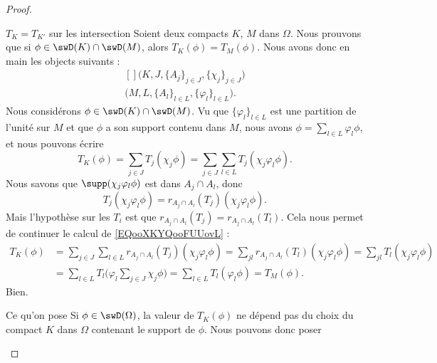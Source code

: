 \begin{proof}
\begin{subproof}
    \item[$T_K=T_{K'}  $ sur les intersection]
        Soient deux compacts \( K\), \( M\) dans \( \Omega\). Nous prouvons que si \( \phi\in\swD(K)\cap\swD(M)\), alors \( T_{K}(\phi)=T_{M}(\phi)\). Nous avons donc en main les objects suivants :
        \begin{equation}
            \begin{aligned}[]
                \big( K, J, \{ A_j \}_{j\in J}, \{ \chi_j \}_{j\in J} \big)\\
                \big( M, L, \{ A_l \}_{l\in L}, \{ \varphi_l \}_{l\in L} \big).
            \end{aligned}
        \end{equation}
        Nous considérons \( \phi\in\swD(K)\cap\swD(M)\). Vu que \(\{ \varphi_l \}_{l\in L} \) est une partition de l'unité sur \( M\) et que \( \phi\) a son support contenu dans \( M\), nous avons \( \phi=\sum_{l\in L}\varphi_l\phi\), et nous pouvons écrire
        \begin{equation}        \label{EQooXKYQooFUUovL}
            T_K(\phi)=\sum_{j\in J}T_j(\chi_j\phi)=\sum_{j\in J}\sum_{l\in L}T_j(\chi_j\varphi_l\phi).
        \end{equation}
        Nous savons que \( \supp(\chi_j\varphi_l\phi)\) est dans \( A_j\cap A_l\), donc 
        \begin{equation}
            T_j(\chi_j\varphi_l\phi)=r_{A_j\cap A_l}(T_j)(\chi_j\varphi_l\phi).
        \end{equation}
        Mais l'hypothèse sur les \( T_i\) est que \( r_{A_j\cap A_l}(T_j)=r_{A_j\cap A_l}(T_l)\). Cela nous permet de continuer le calcul de \eqref{EQooXKYQooFUUovL} :
        \begin{subequations}
            \begin{align}
                T_K(\phi)&=\sum_{j\in J}\sum_{l\in L}r_{A_j\cap A_l}(T_j)(\chi_j\varphi_l\phi)
                =\sum_{jl}r_{A_j\cap A_l}(T_l)(\chi_j\varphi_l\phi)
                =\sum_{jl}T_l(\chi_j\varphi_l\phi)\\
                &=\sum_{l\in L}T_l\big( \varphi_l\sum_{j\in J}\chi_j\phi \big)
                =\sum_{l\in L}T_l(\varphi_l\phi)
                =T_M(\phi).
            \end{align}
        \end{subequations}
        Bien.
    \item[Ce qu'on pose]
        Si \( \phi\in \swD(\Omega)\), la valeur de \( T_K(\phi)\) ne dépend pas du choix du compact \( K\) dans \( \Omega\) contenant le support de \( \phi\). Nous pouvons donc poser

\end{subproof}
\end{proof}
